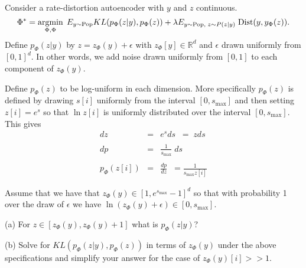 \documentclass{article}
\newcommand{\solution}[1]{\bigskip {\color{red} {\bf Solution}: #1}}
\begin{document}
Consider a rate-distortion autoencoder with $y$ and $z$ continuous.
$$\Phi^* = \operatorname*{argmin}_{\Phi,\Phi}\;E_{y \sim \mathrm{Pop}} KL(p_\Phi(z|y),p_\Phi(z)) + \lambda E_{y \sim \mathrm{Pop},\;z \sim P(z|y)}\;\mathrm{Dist}(y,y_\Phi(z)).$$
Define $p_\Phi(z|y)$ by $z = z_\Phi(y) + \epsilon$ with $z_\Phi[y] \in \mathbb{R}^d$
and $\epsilon$ drawn uniformly from $[0,1]^d$. In other words,
we add noise drawn uniformly from $[0,1]$ to each component of $z_\Phi(y)$.

\medskip
Define $p_\Phi(z)$ to be log-uniform in each dimension.  More specifically
$p_\Phi(z)$ is defined by drawing $s[i]$ uniformly from the interval
$[0,s_{\mathrm{max}}]$ and then setting $z[i] = e^s$ so that $\ln z[i]$ is uniformly distributed over the interval $[0,s_{\mathrm{max}}]$.
This gives
\begin{eqnarray*}
  dz & = & e^sds  \;\;= \;zds\\
  \\
  dp & = & \frac{1}{s_{\mathrm{max}}}\;ds \\
  \\
  p_\Phi(z[i]) & = & \frac{dp}{dz} \;\;= \frac{1}{s_{\mathrm{max}}z[i]}
\end{eqnarray*}

\medskip
Assume that we have that $z_\Phi(y) \in [1,e^{s_{\mathrm{max}}}-1]^d$ so that with probability 1 over the draw of $\epsilon$ we have
$\ln(z_\Phi(y) + \epsilon) \in [0,s_{\mathrm{max}}]$.

\medskip
(a) For $z \in [z_\Phi(y),z_\Phi(y)+1]$ what is $p_\Phi(z|y)$?

\solution{1}

\medskip
(b) Solve for $KL(p_\Phi(z|y),p_\Phi(z))$ in terms of $z_\Phi(y)$ under the above specifications and simplify your answer
for the case of $z_\Phi(y)[i] >> 1$.
\end{document}
